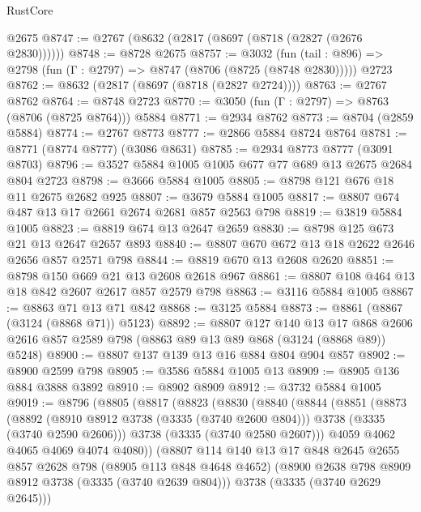 \begin{lexlean}{RustCore}
\begin{coremodule}
    @2675
@8747 := @2767 (@8632 (@2817 (@8697 (@8718 (@2827 (@2676 @2830))))))
@8748 := @8728 @2675
@8757 := @3032
    (fun (tail : @896) => @2798 (fun (Γ : @2797) => @8747 (@8706 (@8725 (@8748 @2830)))))
    @2723
@8762 := @8632 (@2817 (@8697 (@8718 (@2827 @2724))))
@8763 := @2767 @8762
@8764 := @8748 @2723
@8770 := @3050 (fun (Γ : @2797) => @8763 (@8706 (@8725 @8764))) @5884
@8771 := @2934 @8762
@8773 := @8704 (@2859 @5884)
@8774 := @2767 @8773
@8777 := @2866 @5884 @8724 @8764
@8781 := @8771 (@8774 @8777) (@3086 @8631)
@8785 := @2934 @8773 @8777 (@3091 @8703)
@8796 := @3527 @5884 @1005 @1005 @677 @77 @689 @13 @2675 @2684 @804 @2723
@8798 := @3666 @5884 @1005
@8805 := @8798 @121 @676 @18 @11 @2675 @2682 @925
@8807 := @3679 @5884 @1005
@8817 := @8807 @674 @487 @13 @17 @2661 @2674 @2681 @857 @2563 @798
@8819 := @3819 @5884 @1005
@8823 := @8819 @674 @13 @2647 @2659
@8830 := @8798 @125 @673 @21 @13 @2647 @2657 @893
@8840 := @8807 @670 @672 @13 @18 @2622 @2646 @2656 @857 @2571 @798
@8844 := @8819 @670 @13 @2608 @2620
@8851 := @8798 @150 @669 @21 @13 @2608 @2618 @967
@8861 := @8807 @108 @464 @13 @18 @842 @2607 @2617 @857 @2579 @798
@8863 := @3116 @5884 @1005
@8867 := @8863 @71 @13 @71 @842
@8868 := @3125 @5884
@8873 := @8861 (@8867 (@3124 (@8868 @71)) @5123)
@8892 := @8807
    @127
    @140
    @13
    @17
    @868
    @2606
    @2616
    @857
    @2589
    @798
    (@8863 @89 @13 @89 @868 (@3124 (@8868 @89)) @5248)
@8900 := @8807 @137 @139 @13 @16 @884 @804 @904 @857
@8902 := @8900 @2599 @798
@8905 := @3586 @5884 @1005 @13
@8909 := @8905 @136 @884 @3888 @3892
@8910 := @8902 @8909
@8912 := @3732 @5884 @1005
@9019 := @8796
    (@8805
      (@8817
        (@8823
          (@8830
            (@8840
              (@8844
                (@8851
                  (@8873
                    (@8892
                      (@8910 @8912 @3738 (@3335 (@3740 @2600 @804)))
                      @3738
                      (@3335 (@3740 @2590 @2606)))
                    @3738
                    (@3335 (@3740 @2580 @2607)))
                  @4059
                  @4062
                  @4065
                  @4069
                  @4074
                  @4080))
              (@8807
                @114
                @140
                @13
                @17
                @848
                @2645
                @2655
                @857
                @2628
                @798
                (@8905 @113 @848 @4648 @4652)
                (@8900 @2638 @798 @8909 @8912 @3738 (@3335 (@3740 @2639 @804)))
                @3738
                (@3335 (@3740 @2629 @2645)))

\end{coremodule}
\end{lexlean}
